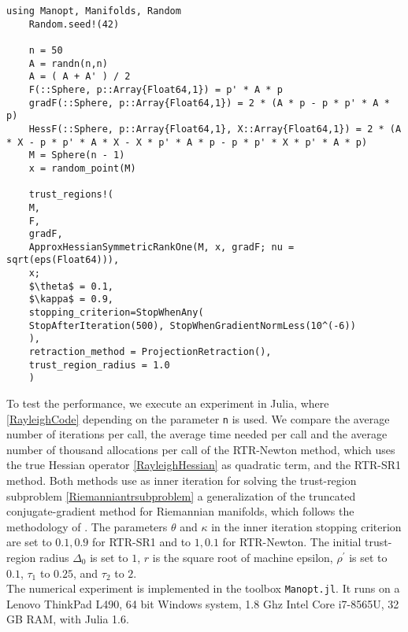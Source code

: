 \begin{lstlisting}[mathescape, caption={The Rayleigh quotient minimization experiment in Julia for $n = 500$.}, label={RayleighCode}]
    using Manopt, Manifolds, Random
    Random.seed!(42)

    n = 50
    A = randn(n,n)
    A = ( A + A' ) / 2
    F(::Sphere, p::Array{Float64,1}) = p' * A * p
    gradF(::Sphere, p::Array{Float64,1}) = 2 * (A * p - p * p' * A * p)
    HessF(::Sphere, p::Array{Float64,1}, X::Array{Float64,1}) = 2 * (A * X - p * p' * A * X - X * p' * A * p - p * p' * X * p' * A * p)
    M = Sphere(n - 1)
    x = random_point(M)

    trust_regions!(
    M,
    F,
    gradF,
    ApproxHessianSymmetricRankOne(M, x, gradF; nu = sqrt(eps(Float64))),
    x;
    $\theta$ = 0.1,
    $\kappa$ = 0.9,
    stopping_criterion=StopWhenAny(
    StopAfterIteration(500), StopWhenGradientNormLess(10^(-6))
    ),
    retraction_method = ProjectionRetraction(),
    trust_region_radius = 1.0
    )
\end{lstlisting}
To test the performance, we execute an experiment in Julia, where \cref{RayleighCode} depending on the parameter \lstinline!n! is used. We compare the average number of iterations per call, the average time needed per call and the average number of thousand allocations per call of the RTR-Newton method, which uses the true Hessian operator \cref{RayleighHessian} as quadratic term, and the RTR-SR1 method. Both methods use as inner iteration for solving the trust-region subproblem \cref{Riemanniantrsubproblem} a generalization of the truncated conjugate-gradient method for Riemannian manifolds, which follows the methodology of \cite[Algorithm~11]{AbsilMahonySepulchre:2008}. The parameters $\theta$ and $\kappa$ in the inner iteration stopping criterion \cite[(7.10)]{AbsilMahonySepulchre:2008} are set to $0.1, 0.9$ for RTR-SR1 and to $1, 0.1$ for RTR-Newton. The initial trust-region radius $\Delta_0$ is set to $1$, $r$ is the square root of machine epsilon, $\rho^{\prime}$ is set to $0.1$, $\tau_1$ to $0.25$, and $\tau_2$ to $2$. \\
The numerical experiment is implemented in the toolbox \lstinline!Manopt.jl!. It runs on a Lenovo ThinkPad L490, 64 bit Windows system, 1.8 Ghz Intel Core i7-8565U, 32 GB RAM, with Julia 1.6.
